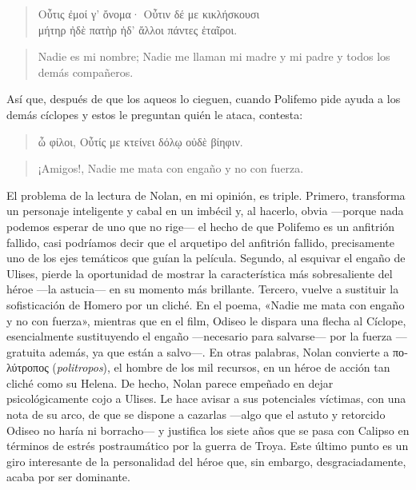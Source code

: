 \documentclass[11pt,a4paper]{article}
\newcommand{\gr}[1]{\foreignlanguage{greek}{#1}}
\begin{document}
\begin{verse}
\foreignlanguage{greek}{Οὖτις ἐμοί γ' ὄνομα· Οὖτιν δέ με κικλήσκουσι\\
μήτηρ ἠδὲ πατὴρ ἠδ' ἄλλοι πάντες ἑταῖροι.}
\end{verse}

\begin{verse}
Nadie es mi nombre; Nadie me llaman mi madre y mi padre y todos los demás compañeros.
\end{verse}

Así que, después de que los aqueos lo cieguen, cuando Polifemo pide ayuda a los demás cíclopes y estos le preguntan quién le ataca, contesta:

\begin{verse}
\gr{ὦ φίλοι, Οὖτίς με κτείνει δόλῳ οὐδὲ βίηφιν.}
\end{verse}

\begin{verse}
¡Amigos!, Nadie me mata con engaño y no con fuerza.
\end{verse}

El problema de la lectura de Nolan, en mi opinión, es triple. Primero, transforma un personaje inteligente y cabal en un imbécil y, al hacerlo, obvia ---porque nada podemos esperar de uno que no rige--- el hecho de que Polifemo es un anfitrión fallido, casi podríamos decir que el arquetipo del anfitrión fallido, precisamente uno de los ejes temáticos que guían la película. Segundo, al esquivar el engaño de Ulises, pierde la oportunidad de mostrar la característica más sobresaliente del héroe ---la astucia--- en su momento más brillante. Tercero, vuelve a sustituir la sofisticación de Homero por un cliché. En el poema, «Nadie me mata con engaño y no con fuerza», mientras que en el film, Odiseo le dispara una flecha al Cíclope, esencialmente sustituyendo el engaño ---necesario para salvarse--- por la fuerza ---gratuita además, ya que están a salvo---. En otras palabras, Nolan convierte a \gr{πολύτροπος} (\emph{politropos}), el hombre de los mil recursos, en un héroe de acción tan cliché como su Helena. De hecho, Nolan parece empeñado en dejar psicológicamente cojo a Ulises. Le hace avisar a sus potenciales víctimas, con una nota de su arco, de que se dispone a cazarlas ---algo que el astuto y retorcido Odiseo no haría ni borracho--- y justifica los siete años que se pasa con Calipso en términos de estrés postraumático por la guerra de Troya. Este último punto es un giro interesante de la personalidad del héroe que, sin embargo, desgraciadamente, acaba por ser dominante. 
\end{document}

